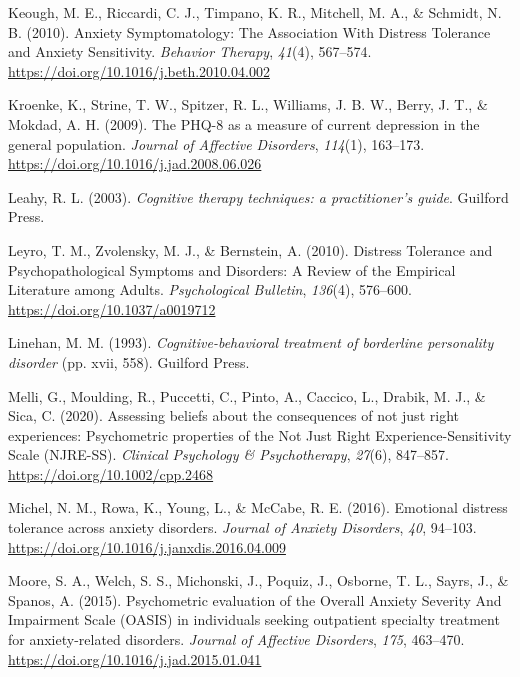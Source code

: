 \documentclass[
  man,floatsintext]{apa7}
\newlength{\cslhangindent}
\newlength{\cslentryspacingunit} %
\newenvironment{CSLReferences}[2] %
 {%
  \setlength{\parindent}{0pt}
  \ifodd #1
  \let\oldpar\par
  \def\par{\hangindent=\cslhangindent\oldpar}
  \fi
  \setlength{\parskip}{#2\cslentryspacingunit}
 }%
 {}
\begin{document}
\begin{CSLReferences}{1}{0}
\leavevmode{}%
Keough, M. E., Riccardi, C. J., Timpano, K. R., Mitchell, M. A., \& Schmidt, N. B. (2010). Anxiety Symptomatology: The Association With Distress Tolerance and Anxiety Sensitivity. \emph{Behavior Therapy}, \emph{41}(4), 567--574. \url{https://doi.org/10.1016/j.beth.2010.04.002}

\leavevmode{}%
Kroenke, K., Strine, T. W., Spitzer, R. L., Williams, J. B. W., Berry, J. T., \& Mokdad, A. H. (2009). The PHQ-8 as a measure of current depression in the general population. \emph{Journal of Affective Disorders}, \emph{114}(1), 163--173. \url{https://doi.org/10.1016/j.jad.2008.06.026}

\leavevmode{}%
Leahy, R. L. (2003). \emph{Cognitive therapy techniques: a practitioner's guide}. Guilford Press.

\leavevmode{}%
Leyro, T. M., Zvolensky, M. J., \& Bernstein, A. (2010). Distress Tolerance and Psychopathological Symptoms and Disorders: A Review of the Empirical Literature among Adults. \emph{Psychological Bulletin}, \emph{136}(4), 576--600. \url{https://doi.org/10.1037/a0019712}

\leavevmode{}%
Linehan, M. M. (1993). \emph{Cognitive-behavioral treatment of borderline personality disorder} (pp. xvii, 558). Guilford Press.

\leavevmode{}%
Melli, G., Moulding, R., Puccetti, C., Pinto, A., Caccico, L., Drabik, M. J., \& Sica, C. (2020). Assessing beliefs about the consequences of not just right experiences: Psychometric properties of the Not Just Right Experience-Sensitivity Scale (NJRE-SS). \emph{Clinical Psychology \& Psychotherapy}, \emph{27}(6), 847--857. \url{https://doi.org/10.1002/cpp.2468}

\leavevmode{}%
Michel, N. M., Rowa, K., Young, L., \& McCabe, R. E. (2016). Emotional distress tolerance across anxiety disorders. \emph{Journal of Anxiety Disorders}, \emph{40}, 94--103. \url{https://doi.org/10.1016/j.janxdis.2016.04.009}

\leavevmode{}%
Moore, S. A., Welch, S. S., Michonski, J., Poquiz, J., Osborne, T. L., Sayrs, J., \& Spanos, A. (2015). Psychometric evaluation of the Overall Anxiety Severity And Impairment Scale (OASIS) in individuals seeking outpatient specialty treatment for anxiety-related disorders. \emph{Journal of Affective Disorders}, \emph{175}, 463--470. \url{https://doi.org/10.1016/j.jad.2015.01.041}


\end{CSLReferences}
\end{document}
